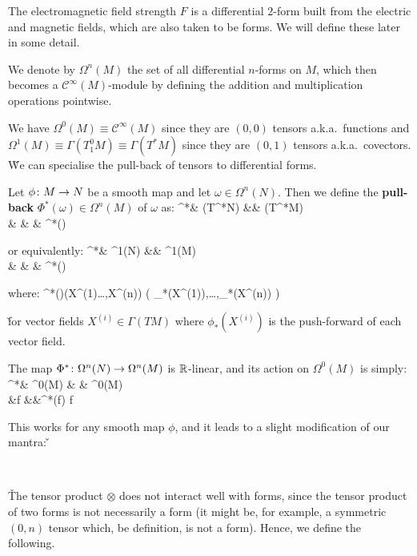 \be
The electromagnetic field strength $F$ is a differential $2$-form built from the electric and magnetic fields, which
are also taken to be forms. We will define these later in some detail.
\ee

\bd [$\Omega^n(M)$]
We denote by $\Omega^n(M)$ the set of all differential $n$-forms on $M$, which then becomes a $\mathcal{C}^\infty(M)
$-module by defining the addition and multiplication operations pointwise.
\ed

We have $\Omega^0(M)\equiv \mathcal{C}^\infty(M)$ since they are $(0,0)$ tensors a.k.a.\ functions and $\Omega^1(M)
\equiv \Gamma(T^0_1 M)\equiv\Gamma(T^*M)$ since they are $(0,1)$ tensors a.k.a.\ covectors. \v

We can specialise the pull-back of tensors to differential forms.

Let $\phi\colon M \to N$ be a smooth map and let $\omega\in \Omega^n(N)$. Then we define the \textbf{pull-back} $\Phi^*
(\omega)\in \Omega^n(M)$ of $\omega$ as:
\Phi^*\cl & \Gamma(T^*N) &\to & \Gamma(T^*M)\\ & \omega & \mapsto & \Phi^*(\omega)
\ei

or equivalently:
\Phi^*\cl & \Omega^1(N) &\to & \Omega^1(M)\\ & \omega & \mapsto & \Phi^*(\omega)
\ei

where:
\bse
\Phi^*(\omega)(X^{(1)}\ldots,X^{(n)}) \coloneqq \omega \bigl( \phi_*(X^{(1)}),\ldots,\phi_*(X^{(n)}) \bigr)
\ese

\v

for vector fields $X^{(i)} \in \Gamma(TM)$ where $\phi_*(X^{(i)})$ is the push-forward of each vector field.
\ed

The map $\Phi^*\colon\Omega^n(N)\to\Omega^n(M)$ is $\mathbb{R}$-linear, and its action on $\Omega^0(M)$ is simply:
\Phi^*\cl & \Omega^0(M) & \to & \Omega^0(M)\\ &f &\mapsto &\Phi^*(f) \coloneqq f\circ \phi
\ei

This works for any smooth map $\phi$, and it leads to a slight modification of our mantra: \v

\begin{center}
\\ 
\end{center}

\v

The tensor product $\otimes$ does not interact well with forms, since the tensor product of two forms is not
necessarily a form (it might be, for example, a symmetric $(0,n)$ tensor which, be definition, is not a form). Hence,
we define the following.

